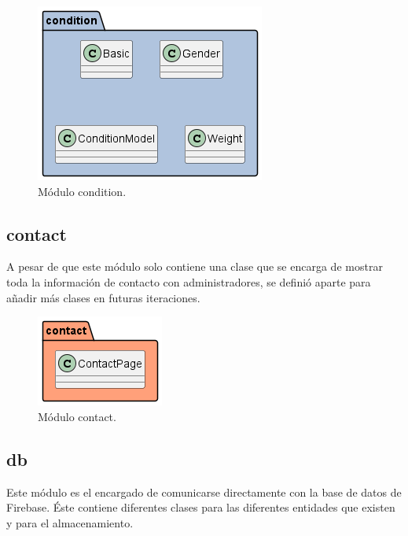 \documentclass[a4paper, 12pt]{article}
\begin{document}
\begin{figure}[H]
	\begin{center}
		{\includegraphics[]{diagram/Condition.png}\par}
		\caption{Módulo condition.}
	\end{center}
\end{figure}

\subsection*{contact}

A pesar de que este módulo solo contiene una clase que se encarga de mostrar toda la información de contacto con administradores, se definió aparte para añadir más clases en futuras iteraciones.

\begin{figure}[H]
	\begin{center}
		{\includegraphics[]{diagram/Contact.png}\par}
		\caption{Módulo contact.}
	\end{center}
\end{figure}


\subsection*{db}

Este módulo es el encargado de comunicarse directamente con la base de datos de Firebase. Éste contiene diferentes clases para las diferentes entidades que existen y para el almacenamiento.
\end{document}

